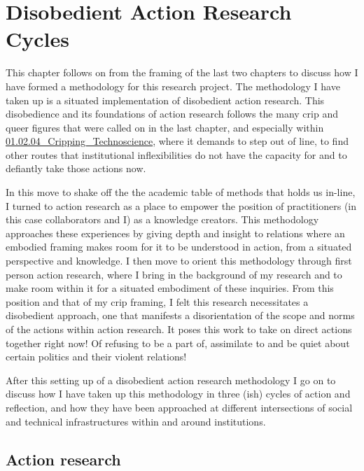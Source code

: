 \hypertarget{disobedient-action-research-cycles}{%
\section[Disobedient Action Research
Cycles]{\texorpdfstring{\protect\hypertarget{anchor}{}{}Disobedient
Action Research
Cycles}{Disobedient Action Research Cycles}}\label{disobedient-action-research-cycles}}

This chapter follows on from the framing of the last two chapters to
discuss how I have formed a methodology for this research project. The
methodology I have taken up is a situated implementation of disobedient
action research. This disobedience and its foundations of action
research follows the many crip and queer figures that were called on in
the last chapter, and especially within
\href{../../01_Disability_justice_and_life_affirmation_flipping_the_table/sections/01.02.04_Cripping_Technoscience.md}{01.02.04\_Cripping\_Technoscience},
where it demands to step out of line, to find other routes that
institutional inflexibilities do not have the capacity for and to
defiantly take those actions now.

In this move to shake off the the academic table of methods that holds
us in-line, I turned to action research as a place to empower the
position of practitioners (in this case collaborators and I) as a
knowledge creators. This methodology approaches these experiences by
giving depth and insight to relations where an embodied framing makes
room for it to be understood in action, from a situated perspective and
knowledge. I then move to orient this methodology through first person
action research, where I bring in the background of my research and to
make room within it for a situated embodiment of these inquiries. From
this position and that of my crip framing, I felt this research
necessitates a disobedient approach, one that manifests a disorientation
of the scope and norms of the actions within action research. It poses
this work to take on direct actions together right now! Of refusing to
be a part of, assimilate to and be quiet about certain politics and
their violent relations!

After this setting up of a disobedient action research methodology I go
on to discuss how I have taken up this methodology in three (ish) cycles
of action and reflection, and how they have been approached at different
intersections of social and technical infrastructures within and around
institutions.

\hypertarget{action-research}{%
\subsection[Action
research]{\texorpdfstring{\protect\hypertarget{anchor}{}{}Action
research}{Action research}}\label{action-research}}

